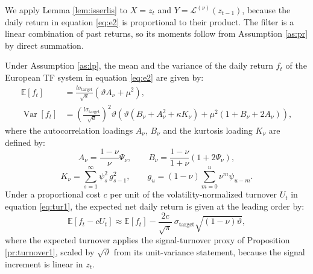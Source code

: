 \documentclass[hidelinks]{siamonline250211}
\DeclareMathOperator{\Var}{Var}
\begin{document}
We apply Lemma \ref{lem:isserlis} to $X=z_{t}$ and $Y=\mathcal{L}^{(\nu)}(z_{t-1})$, because the daily return in equation \eqref{eq:e2} is proportional to their product. The filter is a linear combination of past returns, so its moments follow from Assumption \ref{as:pr} by direct summation.

\begin{proposition}\label{prop:dailyvar}
	Under Assumption \ref{as:lp}, the mean and the variance of the daily return $f_{t}$ of the European TF system in equation \eqref{eq:e2} are given by:
	\begin{equation} \label{eq:sr_moments}
		\begin{split}
			\mathbb{E}\left[ f_{t} \right] & = \frac{l\sigma_{\mathrm{target}}}{\sqrt{a}} \left( \vartheta A_{\nu} + \mu^{2} \right), \\
			\Var\left[ f_{t} \right] & = \left(\frac{l\sigma_{\mathrm{target}}}{\sqrt{a}}\right)^{2} \vartheta \left( \vartheta \left( B_{\nu} + A^{2}_{\nu} + \kappa K_{\nu}\right) + \mu^{2}\left( 1 + B_{\nu} + 2A_{\nu} \right) \right),
		\end{split}
	\end{equation}
	where the autocorrelation loadings $A_{\nu}$, $B_{\nu}$ and the kurtosis loading $K_{\nu}$ are defined by:
	\begin{equation} \label{eq:sr_ab}
		A_{\nu} = \frac{1-\nu}{\nu}\Psi_{\nu}, \qquad B_{\nu} = \frac{1-\nu}{1+\nu}\left( 1 + 2\Psi_{\nu} \right),
	\end{equation}
	\begin{equation} \label{eq:sr_k}
		K_{\nu} = \sum^{\infty}_{s=1} \psi^{2}_{s}\, g^{2}_{s-1}, \qquad g_{u} = \left(1-\nu\right)\sum^{u}_{m=0}\nu^{m}\psi_{u-m}.
	\end{equation}
	Under a proportional cost $c$ per unit of the volatility-normalized turnover $U_{t}$ in equation \eqref{eq:tur1}, the expected net daily return is given at the leading order by:
	\begin{equation} \label{eq:sr_netmean}
		\mathbb{E}\left[ f_{t} - c U_{t} \right] \approx \mathbb{E}\left[ f_{t} \right] - \frac{2c}{\sqrt{\pi}}\,\sigma_{\mathrm{target}}\sqrt{(1-\nu)\vartheta},
	\end{equation}
	where the expected turnover applies the signal-turnover proxy of Proposition \ref{pr:turnover1}, scaled by $\sqrt{\vartheta}$ from its unit-variance statement, because the signal increment is linear in $z_{t}$.
\end{proposition}
\end{document}
